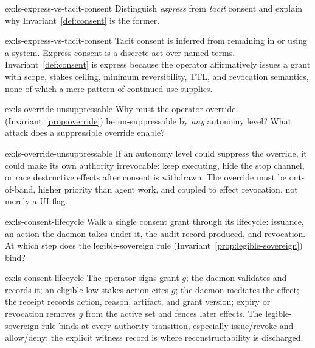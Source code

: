 \documentclass[11pt,a4paper]{article}
\theoremstyle{definition}
\theoremstyle{plain}
\begin{document}

\begin{pdexercise}[kind=Check,rating=1]{ex:ls-express-vs-tacit-consent}
Distinguish \emph{express} from \emph{tacit} consent and explain why
Invariant~\ref{def:consent} is the former.
\end{pdexercise}
\begin{pdsolution}{ex:ls-express-vs-tacit-consent}
Tacit consent is inferred from remaining in or using a system. Express consent is a discrete act over named terms. Invariant~\ref{def:consent} is express because the operator affirmatively issues a grant with scope, stakes ceiling, minimum reversibility, TTL, and revocation semantics, none of which a mere pattern of continued use supplies.
\end{pdsolution}
\begin{pdexercise}[kind=Check,rating=1]{ex:ls-override-unsuppressable}
Why must the operator-override
(Invariant~\ref{prop:override}) be un-suppressable by \emph{any} autonomy level? What
attack does a suppressible override enable?
\end{pdexercise}
\begin{pdsolution}{ex:ls-override-unsuppressable}
If an autonomy level could suppress the override, it could make its own authority irrevocable: keep executing, hide the stop channel, or race destructive effects after consent is withdrawn. The override must be out-of-band, higher priority than agent work, and coupled to effect revocation, not merely a UI flag.
\end{pdsolution}
\begin{pdexercise}[kind=Trace,rating=2]{ex:ls-consent-lifecycle}
Walk a single consent grant through its lifecycle: issuance, an action the
daemon takes under it, the audit record produced, and revocation. At which step does
the legible-sovereign rule (Invariant~\ref{prop:legible-sovereign}) bind?
\end{pdexercise}
\begin{pdsolution}{ex:ls-consent-lifecycle}
The operator signs grant $g$; the daemon validates and records it; an eligible low-stakes action cites $g$; the daemon mediates the effect; the receipt records action, reason, artifact, and grant version; expiry or revocation removes $g$ from the active set and fences later effects. The legible-sovereign rule binds at every authority transition, especially issue/revoke and allow/deny; the explicit witness record is where reconstructability is discharged.
\end{pdsolution}
\end{document}
